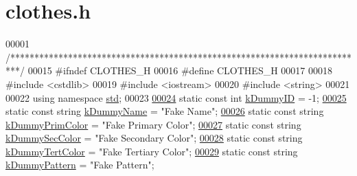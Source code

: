 \hypertarget{clothes_8h_source}{}\section{clothes.\+h}

\begin{DoxyCode}
00001 \textcolor{comment}{/**************************************************************************/}
00015 \textcolor{preprocessor}{#ifndef CLOTHES\_H}
00016 \textcolor{preprocessor}{#define CLOTHES\_H}
00017 
00018 \textcolor{preprocessor}{#include <cstdlib>}
00019 \textcolor{preprocessor}{#include <iostream>}
00020 \textcolor{preprocessor}{#include <string>}
00021 
00022 \textcolor{keyword}{using namespace }\mbox{\hyperlink{namespacestd}{std}};
00023 
\mbox{\hyperlink{clothes_8h_a77186917343a417a2369cdff0bc86d31}{00024}} \textcolor{keyword}{static} \textcolor{keyword}{const} \textcolor{keywordtype}{int} \mbox{\hyperlink{clothes_8h_a77186917343a417a2369cdff0bc86d31}{kDummyID}} = -1;
\mbox{\hyperlink{clothes_8h_adba739b5125fd5a4066ec0ef063c0657}{00025}} \textcolor{keyword}{static} \textcolor{keyword}{const} \textcolor{keywordtype}{string} \mbox{\hyperlink{clothes_8h_adba739b5125fd5a4066ec0ef063c0657}{kDummyName}} = \textcolor{stringliteral}{"Fake Name"};
\mbox{\hyperlink{clothes_8h_a1b9c685d3bf2811d95b65e0d396c1344}{00026}} \textcolor{keyword}{static} \textcolor{keyword}{const} \textcolor{keywordtype}{string} \mbox{\hyperlink{clothes_8h_a1b9c685d3bf2811d95b65e0d396c1344}{kDummyPrimColor}} = \textcolor{stringliteral}{"Fake Primary Color"};
\mbox{\hyperlink{clothes_8h_a71c39811135425d881af7760da63a73a}{00027}} \textcolor{keyword}{static} \textcolor{keyword}{const} \textcolor{keywordtype}{string} \mbox{\hyperlink{clothes_8h_a71c39811135425d881af7760da63a73a}{kDummySecColor}} = \textcolor{stringliteral}{"Fake Secondary Color"};
\mbox{\hyperlink{clothes_8h_a094dde85547895fd70dafb3ab10c6783}{00028}} \textcolor{keyword}{static} \textcolor{keyword}{const} \textcolor{keywordtype}{string} \mbox{\hyperlink{clothes_8h_a094dde85547895fd70dafb3ab10c6783}{kDummyTertColor}} = \textcolor{stringliteral}{"Fake Tertiary Color"};
\mbox{\hyperlink{clothes_8h_a2e72ae4d77adb7bc9cbecf4dea1e9e22}{00029}} \textcolor{keyword}{static} \textcolor{keyword}{const} \textcolor{keywordtype}{string} \mbox{\hyperlink{clothes_8h_a2e72ae4d77adb7bc9cbecf4dea1e9e22}{kDummyPattern}} = \textcolor{stringliteral}{"Fake Pattern"};

\end{DoxyCode}
